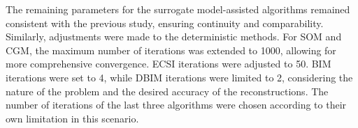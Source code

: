 			The remaining parameters for the surrogate model-assisted algorithms remained consistent with the previous study, ensuring continuity and comparability. Similarly, adjustments were made to the deterministic methods. For SOM and CGM, the maximum number of iterations was extended to 1000, allowing for more comprehensive convergence. ECSI iterations were adjusted to 50. BIM iterations were set to 4, while DBIM iterations were limited to 2, considering the nature of the problem and the desired accuracy of the reconstructions. The number of iterations of the last three algorithms were chosen according to their own limitation in this scenario.
		
			\begin{figure}[!h]
				\centering
				 \\

\end{figure}
